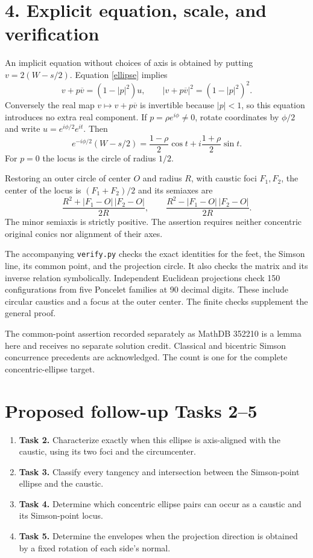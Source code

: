 \documentclass[11pt]{article}
\newcommand{\bc}[1]{\overline{#1}}
\begin{document}
\newpage
\section*{4. Explicit equation, scale, and verification}
An implicit equation without choices of axis is obtained by putting
$v=2(W-s/2)$. Equation \eqref{ellipse} implies
\[
 v+p\bc v=(1-|p|^2)u,\qquad
          |v+p\bc v|^2=(1-|p|^2)^2.
\]
Conversely the real map $v\mapsto v+p\bc v$ is invertible because
$|p|<1$, so this equation introduces no extra real component.
If $p=\rho e^{i\phi}\ne0$, rotate coordinates by $\phi/2$ and write
$u=e^{i\phi/2}e^{it}$. Then
\[
 e^{-i\phi/2}(W-s/2)
     =\frac{1-\rho}{2}\cos t
        +i\frac{1+\rho}{2}\sin t.
\]
For $p=0$ the locus is the circle of radius $1/2$.

Restoring an outer circle of center $O$ and radius $R$, with caustic
foci $F_1,F_2$, the center of the locus is $(F_1+F_2)/2$ and its
semiaxes are
\[
             \frac{R^2+|F_1-O|\,|F_2-O|}{2R},
       \qquad
             \frac{R^2-|F_1-O|\,|F_2-O|}{2R}.
\]
The minor semiaxis is strictly positive. The assertion requires neither
concentric original conics nor alignment of their axes.

The accompanying \texttt{verify.py} checks the exact identities for
the feet, the Simson line, its common point, and the projection circle.
It also checks the matrix and its inverse relation symbolically.
Independent Euclidean projections check 150 configurations from five
Poncelet families at 90 decimal digits. These include circular caustics
and a focus at the outer center. The finite checks supplement the
general proof.

The common-point assertion recorded separately as MathDB 352210 is a
lemma here and receives no separate solution credit. Classical and
bicentric Simson concurrence precedents are acknowledged. The count is
one for the complete concentric-ellipse target.

\section*{Proposed follow-up Tasks 2--5}
\begin{enumerate}
\item \textbf{Task 2.} Characterize exactly when this ellipse is
axis-aligned with the caustic, using its two foci and the circumcenter.
\item \textbf{Task 3.} Classify every tangency and intersection between
the Simson-point ellipse and the caustic.
\item \textbf{Task 4.} Determine which concentric ellipse pairs can occur
as a caustic and its Simson-point locus.
\item \textbf{Task 5.} Determine the envelopes when the projection
direction is obtained by a fixed rotation of each side's normal.
\end{enumerate}
\end{document}
